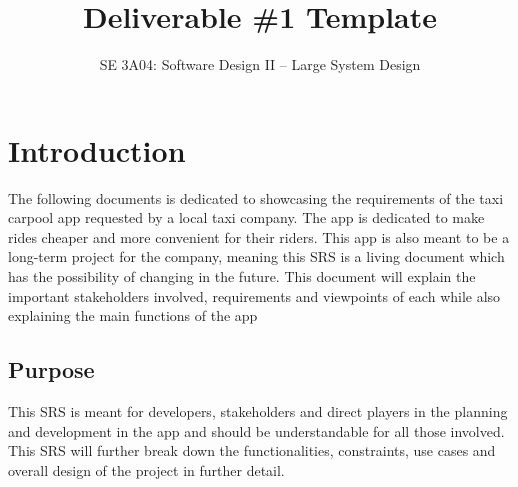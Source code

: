 \documentclass[]{article}
\title{Deliverable \#1 Template}
\author{SE 3A04: Software Design II -- Large System Design}
\date{}
\begin{document}
\maketitle	

\section{Introduction}
\label{sec:introduction}

The following documents is dedicated to showcasing the requirements of the taxi carpool app requested by a local taxi company. The app is dedicated to make rides cheaper and more convenient for their riders. This app is also meant to be a long-term project for the company, meaning this SRS is a living document which has the possibility of changing in the future. This document will explain the important stakeholders involved, requirements and viewpoints of each while also explaining the main functions of the app


\subsection{Purpose}
\label{sub:purpose}
This SRS is meant for developers, stakeholders and direct players in the planning and development in the app and should be understandable for all those involved. This SRS will further break down the functionalities, constraints, use cases and overall design of the project in further detail. 

\end{document}
